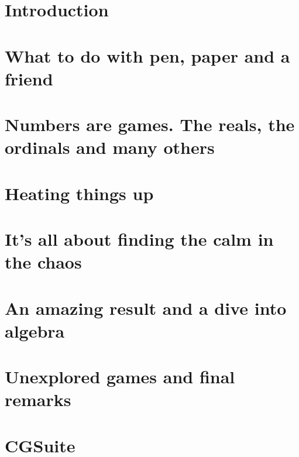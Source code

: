 \documentclass[12pt,twoside]{report}
\let\oldchapter\chapter%
\renewcommand{\chapter}{\cleardoublepage\oldchapter}%
\begin{document}
\newpage
    

    

    {\hypersetup{linkcolor=black}
        \tableofcontents
        \listoffigures
    }
        {\hypersetup{linkcolor=mycolor}}
    
    \chapter{Introduction} 
    
    
    \chapter{What to do with pen, paper and a friend}
    

    \chapter{Numbers are games. The reals, the ordinals and many others}
    
    
    \chapter{Heating things up}
    
    
    \chapter{It's all about finding the calm in the chaos}
    
    
    \chapter{An amazing result and a dive into algebra}
    
    
    \chapter{Unexplored games and final remarks}
    
    
    
    \nocite{*}
    
    
    \appendix
    \chapter{CGSuite}
    
    
\end{document}
